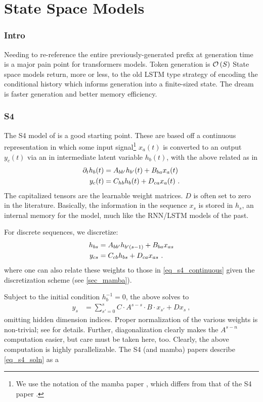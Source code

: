 \part{State Space Models}

\section{Intro\label{sec_ssm_intro}}

Needing to re-reference the entire previously-generated prefix at generation time is a major pain
point for transformers models. Token generation is $ \mathcal{O} \left( S \right)  $ State space models
return, more or less, to the old LSTM type strategy of encoding the conditional history which
informs generation into a finite-sized state. The dream is faster generation and better memory
efficiency.


\section{S4 \label{sec_s4}}

The S4 model of \cite{s4} is a good starting point.  These are based off a continuous representation
in which some input signal\footnote{We use the notation of the mamba paper \cite{mamba}, which
differs from that of the S4 paper \cite{s4}.} $ x _{ a }(t) $ is converted to an output $ y _{ c
}(t) $ via an in
intermediate latent variable $ h _{ b }(t) $, with the above related as in
\begin{align}
    \partial _{ t }h _{ b }(t) &= A _{ b b' }h _{ b' }(t) + B _{ b a }x _{ a }(t)\nonumber\\
    y _{ c }(t) &= C _{ h b }h _{ b }(t) + D _{ c a }x _{ a }(t) \label{eq_s4_continuous} \ .
\end{align}
The capitalized tensors are the learnable weight matrices. $ D $ is often set to zero in the
literature. Basically, the information in the sequence $ x _{ s }  $ is stored in $ h _{ s }  $, an
internal memory for the model, much like the RNN/LSTM models of the past.

For discrete sequences, we discretize:
\begin{align}
    h  _{ bs } &= A  _{ b b' }h _{ b' (s-1) } + B  _{ b a }x  _{ as }\nonumber\\
    y  _{ cs } &= C _{ c b }h  _{ bs } + D _{ c a }x  _{ as } \label{eq_s4_discrete} \ .
\end{align}
where one can also relate these weights to those in \eqref{eq_s4_continuous} given the
discretization scheme (see \ref{sec_mamba}).

Subject to the initial condition $ h _{ b } ^{ -1 } =0 $, the above solves to
\begin{align}
    y _{ s }   &= \sum _{ s'=0 } ^{ s }  C \cdot  A ^{ s - s } \cdot B \cdot  x _{ s' } + D x _{ s }  \ , \label{eq_s4_soln}
\end{align}
omitting hidden dimension indices. Proper normalization of the various weights is non-trivial; see
\cite{s4} for details. Further, diagonalization clearly makes the $ A ^{ s-n } $ computation easier,
but care must be taken here, too. Clearly, the above computation is highly parallelizable. The S4
(and mamba) papers describe \eqref{eq_s4_soln} as a

